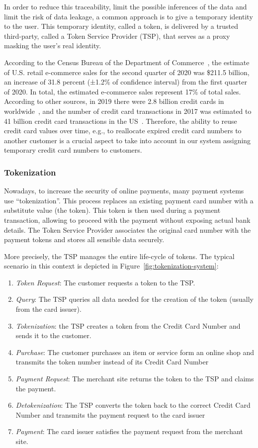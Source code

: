 \documentclass{llncs}
\begin{document}
In order to reduce this traceability, limit the possible inferences of the data and limit the risk of data leakage, a common approach is to give a temporary identity to the user. This temporary identity, called a token, is delivered by a trusted third-party, called a Token Service Provider (TSP), that serves as a proxy masking the user's real identity.

According to the Census Bureau of the Department of Commerce~\cite{census2020}, the estimate of U.S. retail e-commerce sales for the second quarter of 2020 was \$211.5 billion, an increase of 31.8 percent (±1.2\% of confidence interval) from the first quarter of 2020. In total, the estimated e-commerce sales represent 17\% of total sales. According to other sources, in 2019 there were 2.8 billion credit cards in worldwide~\cite{spend2020}, and the number of credit card transactions in 2017 was estimated to 41 billion credit card transactions in the US~\cite{credit2020}. Therefore, the ability to reuse credit card values over time, e.g., to reallocate expired credit card numbers to another customer is a crucial aspect to take into account in our system assigning temporary credit card numbers to customers.

\subsubsection{Tokenization}
Nowadays, to increase the security of online payments, many payment systems use  ``tokenization''. This process replaces an existing payment card number with a substitute value (the token). This token is then used during a payment transaction, allowing to proceed with the payment without exposing actual bank details. The Token Service Provider associates the original card number with the payment tokens and stores all sensible data securely.

More precisely, the TSP manages the entire life-cycle of tokens. The typical scenario in this context is depicted in Figure~\ref{fig:tokenization-system}:
\begin{enumerate}
    \item \textit{Token Request}: The customer requests a token to the TSP.
    \item \textit{Query}: The TSP queries all data needed for the creation of the token (usually from the card issuer).
    \item \textit{Tokenization}: the TSP creates a token from the Credit Card Number and sends it to the customer.
    \item \textit{Purchase}: The customer purchases an item or service form an online shop and transmits the token number instead of its Credit Card Number
    \item \textit{Payment Request}: The merchant site returns the token to the TSP and claims the payment.
    \item \textit{Detokenization}: The TSP converts the token back to the correct Credit Card Number and transmits the payment request to the card issuer
    \item \textit{Payment}: The card issuer satisfies the payment request from the merchant site.
\end{enumerate}
\end{document}
